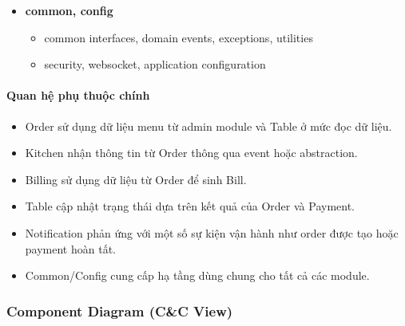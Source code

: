 \documentclass[12pt,a4paper]{article}
\begin{document}
\begin{itemize}
    \begin{itemize}
        \item services: \texttt{AnalyticsService}
        \item controller: \texttt{AnalyticsController}
    \end{itemize}
    \item \textbf{common, config}
    \begin{itemize}
        \item common interfaces, domain events, exceptions, utilities
        \item security, websocket, application configuration
    \end{itemize}
\end{itemize}

\paragraph{Quan hệ phụ thuộc chính}
\begin{itemize}
    \item Order sử dụng dữ liệu menu từ admin module và Table ở mức đọc dữ liệu.
    \item Kitchen nhận thông tin từ Order thông qua event hoặc abstraction.
    \item Billing sử dụng dữ liệu từ Order để sinh Bill.
    \item Table cập nhật trạng thái dựa trên kết quả của Order và Payment.
    \item Notification phản ứng với một số sự kiện vận hành như order được tạo hoặc payment hoàn tất.
    \item Common/Config cung cấp hạ tầng dùng chung cho tất cả các module.
\end{itemize}

\subsubsection{Component Diagram (C\&C View)}
\end{document}
